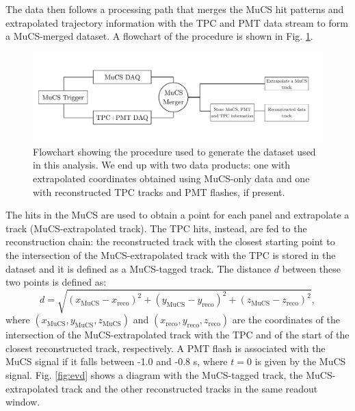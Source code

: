 \documentclass[a4paper]{scrartcl}
\begin{document}
The data then follows a processing path that merges the MuCS hit patterns and extrapolated trajectory information with the TPC and PMT data stream to form a MuCS-merged dataset. A flowchart of the procedure is shown in Fig. \ref{fig:scheme}.

\begin{figure}[htbp]
  \includegraphics[width=\linewidth]{figures/scheme.pdf}
  \caption{Flowchart showing the procedure used to generate the dataset used in this analysis. We end up with two data products: one with extrapolated coordinates obtained using MuCS-only data and one with reconstructed TPC tracks and PMT flashes, if present.} \label{fig:scheme}
\end{figure}

The hits in the MuCS are used to obtain a point for each panel and extrapolate a track (MuCS-extrapolated track). The TPC hits, instead, are fed to the reconstruction chain: the reconstructed track with the closest starting point to the intersection of the MuCS-extrapolated track with the TPC is stored in the dataset and it is defined as a MuCS-tagged track. The distance $d$ between these two points is defined as:
\begin{equation}\label{eq:d}
d = \sqrt{(x_{\mathrm{MuCS}}-x_{\mathrm{reco}})^2+(y_{\mathrm{MuCS}}-y_{\mathrm{reco}})^2+(z_{\mathrm{MuCS}}-z_{\mathrm{reco}})^2},
\end{equation}
where $(x_{\mathrm{MuCS}},y_{\mathrm{MuCS}},z_{\mathrm{MuCS}})$ and $(x_{\mathrm{reco}},y_{\mathrm{reco}},z_{\mathrm{reco}})$ are the coordinates of the intersection of the MuCS-extrapolated track with the TPC and of the start of the closest reconstructed track, respectively.
A PMT flash is associated with the MuCS signal if it falls between -1.0 and -0.8 \textmu s, where $t=0$ is given by the MuCS signal.
Fig. \ref{fig:evd} shows a diagram with the MuCS-tagged track, the MuCS-extrapolated track and the other reconstructed tracks in the same readout window.
\end{document}

